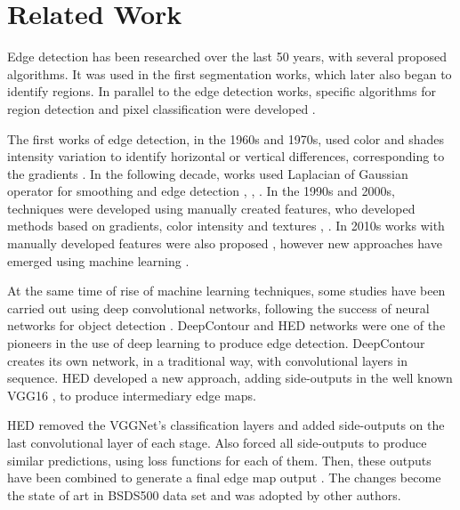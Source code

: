 \section{Related Work}
\label{cap4_trab_rel}

Edge detection has been researched over the last 50 years, with several proposed algorithms. 
It was used in the first segmentation works, which later also began to identify regions.
In parallel to the edge detection works, specific algorithms for region detection and pixel classification were developed \cite{RCF:2017:8100105} \cite{pedrini2008analise}.

The first works of edge detection, in the 1960s and 1970s, used color and shades intensity variation to identify horizontal or vertical differences, corresponding to the gradients \cite{Roberts:1963} \cite{KIRSCH1971315} \cite{ROBINSON1977492} \cite{FREI_CHEN:1674733}.
In the following decade, works used Laplacian of Gaussian operator for smoothing and edge detection \cite{BERZINS1984195}, \cite{Canny:1986}, \cite{HUERTAS_MEDIONI:4767838}.
In the 1990s and 2000s, techniques were developed using manually created features, who developed methods based on gradients, color intensity and textures \cite{KONISHI:1159946}, \cite{MARTIN:1273918}.
In 2010s works with manually developed features were also proposed \cite{LIM:6619250}, however new approaches have emerged using machine learning \cite{StructuredEdges:2015}.

At the same time of rise of machine learning techniques, some studies have been carried out using deep convolutional networks, following the success of neural networks for object detection \cite{Segnet:2017:7803544}.
DeepContour \cite{DeepContour:2015:7299024} and HED \cite{Xie:2017:HED:3158436.3158453} networks were one of the pioneers in the use of deep learning to produce edge detection.
DeepContour creates its own network, in a traditional way, with convolutional layers in sequence.
HED developed a new approach, adding side-outputs in the well known VGG16 \cite{VGGNET:2014}, to produce intermediary edge maps.

HED removed the VGGNet's classification layers and added side-outputs on the last convolutional layer of each stage.
Also forced all side-outputs to produce similar predictions, using loss functions for each of them.
Then, these outputs have been combined to generate a final edge map output \cite{Xie:2017:HED:3158436.3158453}.
The changes become the state of art in BSDS500 data set \cite{amfm_pami2011} and was adopted by other authors.

